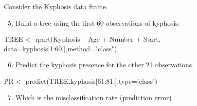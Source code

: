 \documentclass[
  10pt,
  ignorenonframetext,
]{beamer}
\newenvironment{Shaded}{}{}
\newcommand{\DataTypeTok}[1]{#1}
\newcommand{\DecValTok}[1]{#1}
\newcommand{\KeywordTok}[1]{\textcolor[rgb]{0.00,0.00,1.00}{#1}}
\newcommand{\NormalTok}[1]{#1}
\newcommand{\OperatorTok}[1]{#1}
\newcommand{\StringTok}[1]{\textcolor[rgb]{0.00,0.50,0.50}{#1}}
\providecommand{\tightlist}{%
  \setlength{\itemsep}{0pt}\setlength{\parskip}{0pt}}
\begin{document}
\begin{frame}[fragile]{Consider the Kyphosis data frame.}
\protect\hypertarget{consider-the-kyphosis-data-frame.-1}{}

\begin{enumerate}
[1)]
\setcounter{enumi}{4}
\tightlist
\item
  Build a tree using the first 60 observations of kyphosis.
\end{enumerate}

\begin{Shaded}
\begin{Highlighting}[]
\NormalTok{TREE <-}\StringTok{ }\KeywordTok{rpart}\NormalTok{(Kyphosis }\OperatorTok{~}\StringTok{ }\NormalTok{Age }\OperatorTok{+}\StringTok{ }\NormalTok{Number }\OperatorTok{+}\StringTok{ }\NormalTok{Start, }
              \DataTypeTok{data=}\NormalTok{kyphosis[}\DecValTok{1}\OperatorTok{:}\DecValTok{60}\NormalTok{,],}\DataTypeTok{method=}\StringTok{"class"}\NormalTok{)}
\end{Highlighting}
\end{Shaded}

\begin{enumerate}
[1)]
\setcounter{enumi}{5}
\tightlist
\item
  Predict the kyphosis presence for the other 21 observations.
\end{enumerate}

\begin{Shaded}
\begin{Highlighting}[]
\NormalTok{PR <-}\StringTok{ }\KeywordTok{predict}\NormalTok{(TREE,kyphosis[}\DecValTok{61}\OperatorTok{:}\DecValTok{81}\NormalTok{,],}\DataTypeTok{type=}\StringTok{'class'}\NormalTok{)}
\end{Highlighting}
\end{Shaded}

\begin{enumerate}
[1)]
\setcounter{enumi}{6}
\tightlist
\item
  Which is the misclassification rate (prediction error)
\end{enumerate}

\begin{Shaded}
\end{Shaded}


\end{frame}
\end{document}
